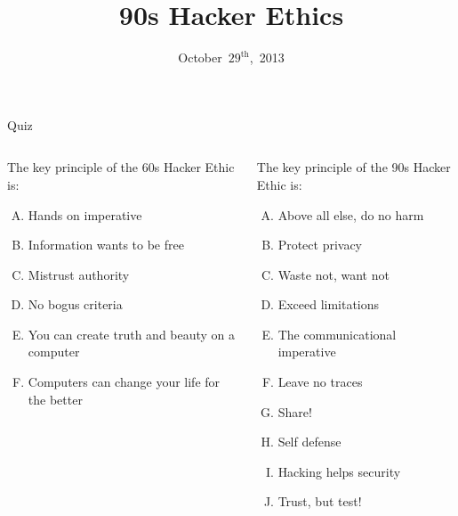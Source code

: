 \documentclass{beamer}
\title{90s Hacker Ethics}
\date{October~$29^{\text{th}}$,~2013}
\begin{document}
\begin{frame}
\titlepage
\end{frame}

\begin{frame}{Quiz}
\begin{columns}[T]
\begin{column}{0.485\textwidth}
The key principle of the 60s Hacker Ethic is:
\begin{enumerate}[(A)]
\item<1> Hands on imperative
\item<1-2> Information wants to be free %
\item<1> Mistrust authority
\item<1> No bogus criteria
\item<1> You can create truth and beauty on a computer
\item<1> Computers can change your life for the better
\end{enumerate}
\end{column}
\begin{column}{0.485\textwidth}
The key principle of the 90s Hacker Ethic is:
\begin{enumerate}[(A)]
\item<1> Above all else, do no harm
\item<1> Protect privacy
\item<1> Waste not, want not
\item<1> Exceed limitations
\item<1-2> The communicational imperative %
\item<1> Leave no traces
\item<1> Share!
\item<1> Self defense
\item<1> Hacking helps security
\item<1> Trust, but test!
\end{enumerate}
\end{column}
\end{columns}
\end{frame}
\end{document}
